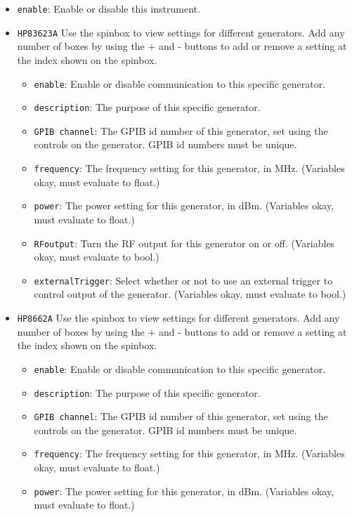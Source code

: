 \documentclass[pdftex,11pt,letterpaper]{article}
\begin{document}
\begin{itemize}
\item \texttt{enable}:  Enable or disable this instrument.

\item \texttt{HP83623A}
Use the spinbox to view settings for different generators.  Add any number of boxes by using the  + and - buttons to add or remove a setting at the index shown on the spinbox.
\begin{itemize}
\item \texttt{enable}:  Enable or disable communication to this specific generator.
\item \texttt{description}:  The purpose of this specific generator.
\item \texttt{GPIB channel}:  The GPIB id number of this generator, set using the controls on the generator.  GPIB id numbers must be unique.
\item \texttt{frequency}:  The frequency setting for this generator, in MHz.  (Variables okay, must evaluate to float.)
\item \texttt{power}:  The power setting for this generator, in dBm.  (Variables okay, must evaluate to float.)
\item \texttt{RFoutput}:  Turn the RF output for this generator on or off.  (Variables okay, must evaluate to bool.)
\item \texttt{externalTrigger}:  Select whether or not to use an external trigger to control output of the generator.  (Variables okay, must evaluate to bool.)
\end{itemize}

\item \texttt{HP8662A}
Use the spinbox to view settings for different generators.  Add any number of boxes by using the  + and - buttons to add or remove a setting at the index shown on the spinbox.
\begin{itemize}
\item \texttt{enable}:  Enable or disable communication to this specific generator.
\item \texttt{description}:  The purpose of this specific generator.
\item \texttt{GPIB channel}:  The GPIB id number of this generator, set using the controls on the generator.  GPIB id numbers must be unique.
\item \texttt{frequency}:  The frequency setting for this generator, in MHz.  (Variables okay, must evaluate to float.)
\item \texttt{power}:  The power setting for this generator, in dBm.  (Variables okay, must evaluate to float.)
\end{itemize}


\end{itemize}
\end{document}
